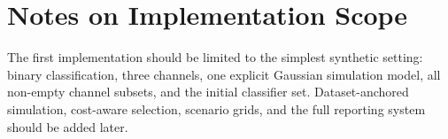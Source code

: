 \documentclass[11pt,a4paper]{article}
\begin{document}
\section{Notes on Implementation Scope}

The first implementation should be limited to the simplest synthetic setting: binary classification, three channels, one explicit Gaussian simulation model, all non-empty channel subsets, and the initial classifier set. Dataset-anchored simulation, cost-aware selection, scenario grids, and the full reporting system should be added later.
\end{document}
